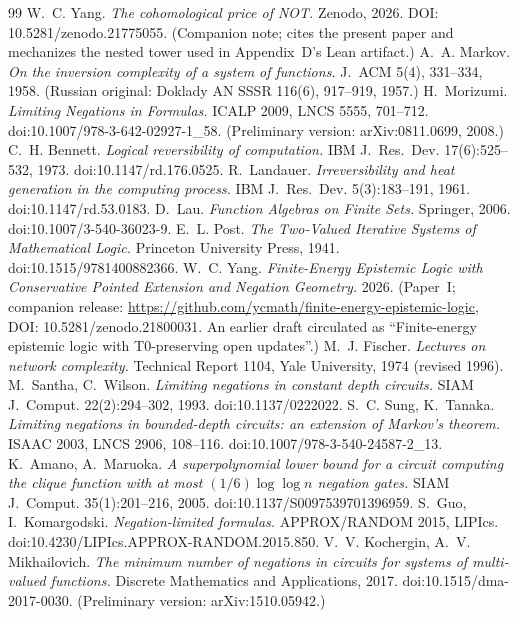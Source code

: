 \documentclass[11pt]{article}
\theoremstyle{remark}
\begin{document}
\begin{thebibliography}{99}
 W.~C. Yang. \emph{The cohomological price of NOT.}
Zenodo, 2026. DOI: 10.5281/zenodo.21775055. (Companion note; cites the
present paper and mechanizes the nested tower used in Appendix~D's Lean
artifact.)
 A.~A. Markov. \emph{On the inversion complexity of a
system of functions.} J.~ACM 5(4), 331--334, 1958. (Russian original:
Doklady AN SSSR 116(6), 917--919, 1957.)
 H.~Morizumi. \emph{Limiting Negations in Formulas.}
ICALP 2009, LNCS 5555, 701--712. doi:10.1007/978-3-642-02927-1\_58.
(Preliminary version: arXiv:0811.0699, 2008.)
 C.~H. Bennett. \emph{Logical reversibility of
computation.} IBM J.~Res.~Dev. 17(6):525--532, 1973. doi:10.1147/rd.176.0525.
 R.~Landauer. \emph{Irreversibility and heat generation
in the computing process.} IBM J.~Res.~Dev. 5(3):183--191, 1961.
doi:10.1147/rd.53.0183.
 D.~Lau. \emph{Function Algebras on Finite Sets.} Springer,
2006. doi:10.1007/3-540-36023-9.
 E.~L. Post. \emph{The Two-Valued Iterative Systems of
Mathematical Logic.} Princeton University Press, 1941.
doi:10.1515/9781400882366.
 W.~C. Yang. \emph{Finite-Energy Epistemic Logic with
Conservative Pointed Extension and Negation Geometry.} 2026. (Paper~I;
companion release: \url{https://github.com/ycmath/finite-energy-epistemic-logic},
DOI: 10.5281/zenodo.21800031. An earlier draft circulated as ``Finite-energy epistemic logic with
T0-preserving open updates''.)
 M.~J. Fischer. \emph{Lectures on network complexity.}
Technical Report 1104, Yale University, 1974 (revised 1996).
 M.~Santha, C.~Wilson. \emph{Limiting negations in
constant depth circuits.} SIAM J.~Comput. 22(2):294--302, 1993.
doi:10.1137/0222022.
 S.~C. Sung, K.~Tanaka. \emph{Limiting negations in
bounded-depth circuits: an extension of Markov's theorem.} ISAAC 2003,
LNCS 2906, 108--116. doi:10.1007/978-3-540-24587-2\_13.
 K.~Amano, A.~Maruoka. \emph{A superpolynomial lower bound
for a circuit computing the clique function with at most
$(1/6)\log\log n$ negation gates.} SIAM J.~Comput. 35(1):201--216, 2005.
doi:10.1137/S0097539701396959.
 S.~Guo, I.~Komargodski. \emph{Negation-limited formulas.}
APPROX/RANDOM 2015, LIPIcs. doi:10.4230/LIPIcs.APPROX-RANDOM.2015.850.
 V.~V. Kochergin, A.~V. Mikhailovich. \emph{The minimum
number of negations in circuits for systems of multi-valued functions.}
Discrete Mathematics and Applications, 2017. doi:10.1515/dma-2017-0030.
(Preliminary version: arXiv:1510.05942.)
\end{thebibliography}
\end{document}
